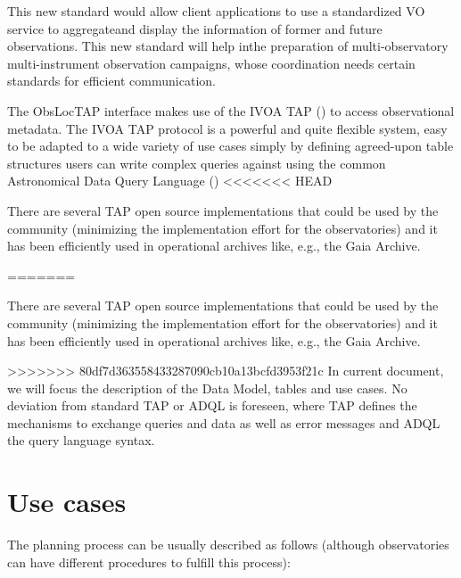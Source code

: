 \documentclass[11pt,a4paper]{ivoa}
\begin{document}
This new standard would allow client applications to use a standardized VO service
to aggregateand display the information of former and future observations. This new standard will help 
inthe preparation of multi-observatory multi-instrument observation campaigns, whose 
coordination needs certain standards for efficient communication.

The ObsLocTAP interface makes use of the IVOA TAP (\cite{2019ivoa.spec.0927D}) to access observational metadata. The IVOA TAP protocol is a powerful and quite flexible
system, easy to be adapted to a wide variety of use cases simply by defining 
agreed-upon table structures users can write complex queries against using the common
Astronomical Data Query Language (\cite{2008ivoa.spec.1030O})
<<<<<<< HEAD

There are several TAP open source implementations that could be used by the community (minimizing the implementation effort for the observatories) and it has been
efficiently used in operational archives like, e.g., the Gaia Archive.

=======

There are several TAP open source implementations that could be used by the community (minimizing the implementation effort for the observatories) and it has been
efficiently used in operational archives like, e.g., the Gaia Archive.

>>>>>>> 80df7d363558433287090cb10a13bcfd3953f21c
In current document, we will focus the description of the Data Model, tables and use cases. No deviation from standard TAP or ADQL is foreseen, where TAP defines the mechanisms to exchange queries and data as well as error messages and ADQL the
query language syntax.

\section{Use cases}
The planning process can be usually described as follows (although observatories can 
have different procedures to fulfill this process): 
\end{document}
